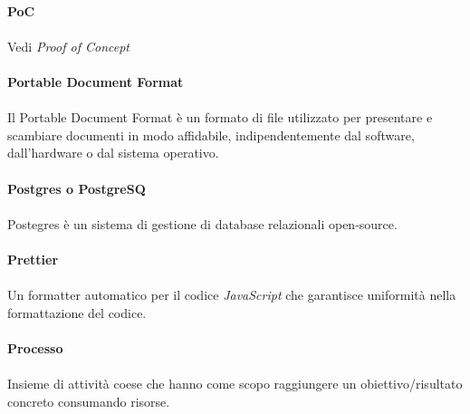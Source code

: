 \documentclass[10pt, a4paper]{article}
\begin{document}
\vspace{2em}
\paragraph{PoC}\noindent\hrulefill
\paragraph{} Vedi \textit{Proof of Concept\pg}

\vspace{2em}
\paragraph{Portable Document Format}\noindent\hrulefill
\paragraph{}Il Portable Document Format è un formato di file utilizzato per presentare e scambiare documenti in modo affidabile, indipendentemente dal software, dall'hardware o dal sistema operativo.

\vspace{2em}
\paragraph{Postgres o PostgreSQ}\noindent\hrulefill
\paragraph{}Postegres è un sistema di gestione di database relazionali open-source.

\vspace{2em}
\paragraph{Prettier}\noindent\hrulefill
\paragraph{}Un formatter automatico per il codice \textit{JavaScript\pg} che garantisce uniformità nella formattazione del codice.


\vspace{2em}
\paragraph{Processo}\noindent\hrulefill
\paragraph{}Insieme di attività coese che hanno come scopo raggiungere un obiettivo/risultato concreto consumando risorse.
\end{document}
